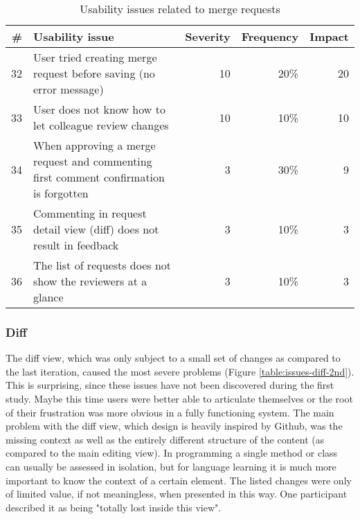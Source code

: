 \begin{table}[h!]
\centering
\begin{tabular}{|r|p{7cm}|r|r|r|}
\hline
\rowcolor[HTML]{EFEFEF}
{\bf \#} & {\bf Usability issue} & {\bf Severity} & {\bf Frequency} & {\bf Impact} \\ \hline
32 & User tried creating merge request before saving (no error message) & 10 & 20\% & 20 \\ \hline
33 & User does not know how to let colleague review changes & 10 & 10\% & 10 \\ \hline
34 & When approving a merge request and commenting first comment confirmation is forgotten & 3 & 30\% & 9 \\ \hline
35 & Commenting in request detail view (diff) does not result in feedback & 3 & 10\% & 3 \\ \hline
36 & The list of requests does not show the reviewers at a glance & 3 & 10\% & 3 \\ \hline
\end{tabular}
\caption{Usability issues related to merge requests}
\label{table:issues-merge}
\end{table}

\subsubsection{Diff}
The diff view, which was only subject to a small set of changes as compared to the last iteration, caused the most severe problems (Figure \ref{table:issues-diff-2nd}). This is surprising, since these issues have not been discovered during the first study. Maybe this time users were better able to articulate themselves or the root of their frustration was more obvious in a fully functioning system. The main problem with the diff view, which design is heavily inspired by Github, was the missing context as well as the entirely different structure of the content (as compared to the main editing view). In programming a single method or class can usually be assessed in isolation, but for language learning it is much more important to know the context of a certain element. The listed changes were only of limited value, if not meaningless, when presented in this way. One participant described it as being "totally lost inside this view".

